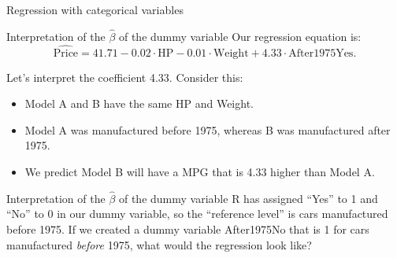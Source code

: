 \documentclass{beamer}\usepackage[]{graphicx}\usepackage[]{color}
\newenvironment{knitrout}{}{} %
\begin{document}
\begin{darkframes}
\begin{frame}[fragile]{Regression with categorical variables}
\begin{knitrout}
\end{knitrout}
      \end{frame}
      
      
      
      \begin{frame}[fragile]{Interpretation of the $\hat\beta$ of the dummy variable}
        Our regression equation is:
        \[
          \widehat{\text{Price}} = 41.71 -
          0.02 \cdot \text{HP} -
          0.01 \cdot \text{Weight} +
          4.33 \cdot \text{After1975Yes}.
        \] 
        \pause

        Let's interpret the coefficient 4.33.
        Consider this:
        \begin{itemize}[<+->]
          \item Model A and B have the same HP and Weight.
          \item Model A was manufactured before 1975, whereas B was manufactured after 1975.
          \item We predict Model B will have a MPG that is 4.33 higher than Model A.
        \end{itemize} 
        \lc
      \end{frame}
      
      
      
      
      \begin{frame}[fragile]{Interpretation of the $\hat\beta$ of the dummy variable}
        R has assigned ``Yes'' to 1 and ``No'' to 0 in our dummy variable, so the ``reference level'' is cars manufactured before 1975.
        \pause\bigskip
        If we created a dummy variable After1975No that is 1 for cars manufactured \emph{before} 1975, what would the regression look like?          
      \end{frame}
      
      
      
      
      
      
      

\end{darkframes}
\end{document}
